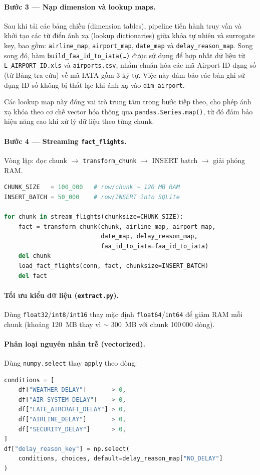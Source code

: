 \paragraph{Bước 3 --- Nạp dimension và lookup maps.}
Sau khi tải các bảng chiều (dimension tables), pipeline tiến hành truy vấn và khởi tạo các từ điển ánh xạ (lookup dictionaries) giữa khóa tự nhiên và surrogate key, bao gồm: \texttt{airline\_map}, \texttt{airport\_map}, \texttt{date\_map} và \texttt{delay\_reason\_map}.
Song song đó, hàm \texttt{build\_faa\_id\_to\_iata(\ldots)} được sử dụng để hợp nhất dữ liệu từ \texttt{L\_AIRPORT\_ID.xls} và \texttt{airports.csv}, nhằm chuẩn hóa các mã Airport ID dạng số (từ Bảng tra cứu) về mã IATA gồm 3 ký tự. Việc này đảm bảo các bản ghi sử dụng ID số không bị thất lạc khi ánh xạ vào \texttt{dim\_airport}.  

Các lookup map này đóng vai trò trung tâm trong bước tiếp theo, cho phép ánh xạ khóa theo cơ chế vector hóa thông qua \texttt{pandas.Series.map()}, từ đó đảm bảo hiệu năng cao khi xử lý dữ liệu theo từng chunk.

\paragraph{Bước 4 --- Streaming \texttt{fact\_flights}.}
Vòng lặp: đọc chunk $\rightarrow$ \texttt{transform\_chunk} $\rightarrow$ INSERT batch $\rightarrow$ giải phóng RAM.
\begin{lstlisting}[language=Python, caption={Vòng lặp streaming trong \texttt{pipeline.py}}]
CHUNK_SIZE   = 100_000   # row/chunk ~ 120 MB RAM
INSERT_BATCH = 50_000    # row/INSERT into SQLite

for chunk in stream_flights(chunksize=CHUNK_SIZE):
    fact = transform_chunk(chunk, airline_map, airport_map,
                           date_map, delay_reason_map,
                           faa_id_to_iata=faa_id_to_iata)
    del chunk
    load_fact_flights(conn, fact, chunksize=INSERT_BATCH)
    del fact
\end{lstlisting}

\paragraph{Tối ưu kiểu dữ liệu (\texttt{extract.py}).}
Dùng \texttt{float32}/\texttt{int8}/\texttt{int16} thay mặc định \texttt{float64}/\texttt{int64} để giảm RAM mỗi chunk
(khoảng 120~MB thay vì $\sim$ 300~MB với chunk 100\,000 dòng).

\paragraph{Phân loại nguyên nhân trễ (vectorized).}
Dùng \texttt{numpy.select} thay \texttt{apply} theo dòng:
\begin{lstlisting}[language=Python, caption={\texttt{np.select} gán \texttt{delay\_reason\_key}}]
conditions = [
    df["WEATHER_DELAY"]       > 0,
    df["AIR_SYSTEM_DELAY"]    > 0,
    df["LATE_AIRCRAFT_DELAY"] > 0,
    df["AIRLINE_DELAY"]       > 0,
    df["SECURITY_DELAY"]      > 0,
]
df["delay_reason_key"] = np.select(
    conditions, choices, default=delay_reason_map["NO_DELAY"]
)
\end{lstlisting}

